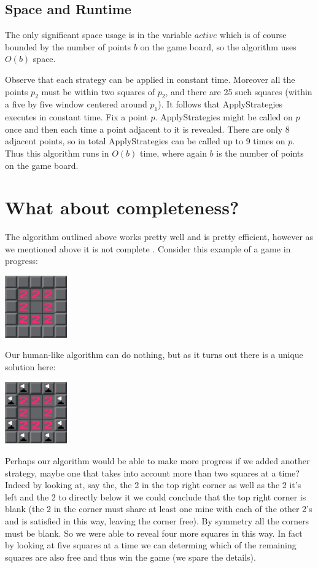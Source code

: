 \documentclass{article}
\theoremstyle{definition}
\theoremstyle{definition}
\theoremstyle{theorem}
\begin{document}
	\subsection*{Space and Runtime}
	The only significant space usage is in the variable $active$ which is of course bounded by the number of points $b$ on the game board, so the algorithm uses $O(b)$ space.
	
	Observe that each strategy can be applied in constant time. Moreover all the points $p_2$ must be within two squares of $p_2$, and there are 25 such squares (within a five by five window centered around $p_1$). It follows that ApplyStrategies executes in constant time. Fix a point $p$. ApplyStrategies might be called on $p$ once and then each time a point adjacent to it is revealed. There are only 8 adjacent points, so in total ApplyStrategies can be called up to 9 times on $p$. Thus this algorithm runs in $O(b)$ time, where again $b$ is the number of points on the game board.
	
	\section*{What about completeness?}\label{whatabout}
	The algorithm outlined above works pretty well and is pretty efficient, however as we mentioned above it is not complete . Consider this example of a game in progress:
	\begin{center}
		\includegraphics[width=0.2\textwidth]{exampleimages/example3a}
	\end{center}
	Our human-like algorithm can do nothing, but as it turns out there is a unique solution here:
	\begin{center}
		\includegraphics[width=0.2\textwidth]{exampleimages/example3b}
	\end{center}
	Perhaps our algorithm would be able to make more progress if we added another strategy, maybe one that takes into account more than two squares at a time? Indeed by looking at, say the, the 2 in the top right corner as well as the 2 it's left and the 2 to directly below it we could conclude that the top right corner is blank (the 2 in the corner must share at least one mine with each of the other 2's and is satisfied in this way, leaving the corner free). By symmetry all the corners must be blank. So we were able to reveal four more squares in this way. In fact by looking at five squares at a time we can determing which of the remaining squares are also free and thus win the game (we spare the details).
	
\end{document}
